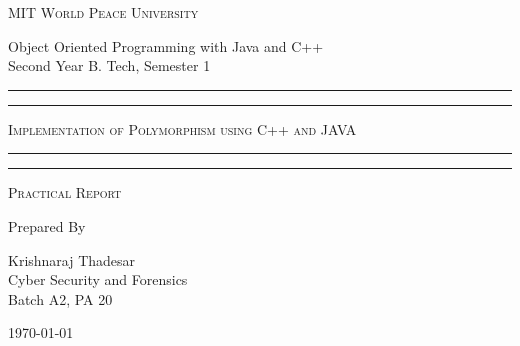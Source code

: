 \documentclass[11pt]{article}
\begin{document}
\begin{titlepage}
	\centering


	\huge\textsc{
		MIT World Peace University
	}\\

	\vspace{0.75\baselineskip} %

	\LARGE{
		Object Oriented Programming with Java and C++\\
		Second Year B. Tech, Semester 1
	}

	\vfill %


	\rule{\textwidth}{1.6pt}\vspace*{-\baselineskip}\vspace*{2pt}
	\rule{\textwidth}{0.6pt}
	\vspace{0.75\baselineskip} %



	\huge{\textsc{
			Implementation of Polymorphism using C++ and JAVA
		}} \\



	\vspace{0.5\baselineskip} %
	\rule{\textwidth}{0.6pt}\vspace*{-\baselineskip}\vspace*{2.8pt}
	\rule{\textwidth}{1.6pt}

	\vspace{1\baselineskip} %


	\LARGE\textsc{
		Practical Report
	} %
	\vfill


	Prepared By
	\vspace{0.5\baselineskip} %

	\Large{
		Krishnaraj Thadesar \\
		Cyber Security and Forensics\\
		Batch A2, PA 20
	}


	\vspace{0.5\baselineskip} %
	\today

\end{titlepage}
\end{document}
